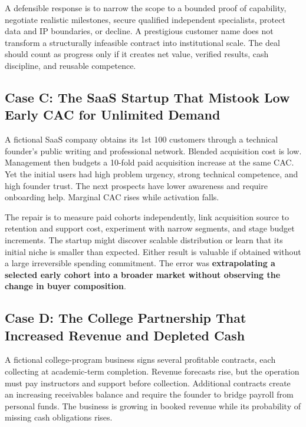 A defensible response is to narrow the scope to a bounded proof of capability, negotiate realistic milestones, secure qualified independent specialists, protect data and IP boundaries, or decline. A prestigious customer name does not transform a structurally infeasible contract into institutional scale. The deal should count as progress only if it creates net value, verified results, cash discipline, and reusable competence.

\subsection*{Case C: The SaaS Startup That Mistook Low Early CAC for Unlimited Demand}

A fictional SaaS company obtains its 1st 100 customers through a technical founder's public writing and professional network. Blended acquisition cost is low. Management then budgets a 10-fold paid acquisition increase at the same CAC. Yet the initial users had high problem urgency, strong technical competence, and high founder trust. The next prospects have lower awareness and require onboarding help. Marginal CAC rises while activation falls.

The repair is to measure paid cohorts independently, link acquisition source to retention and support cost, experiment with narrow segments, and stage budget increments. The startup might discover scalable distribution or learn that its initial niche is smaller than expected. Either result is valuable if obtained without a large irreversible spending commitment. The error was \textbf{extrapolating a selected early cohort into a broader market without observing the change in buyer composition}.

\subsection*{Case D: The College Partnership That Increased Revenue and Depleted Cash}

A fictional college-program business signs several profitable contracts, each collecting at academic-term completion. Revenue forecasts rise, but the operation must pay instructors and support before collection. Additional contracts create an increasing receivables balance and require the founder to bridge payroll from personal funds. The business is growing in booked revenue while its probability of missing cash obligations rises.

